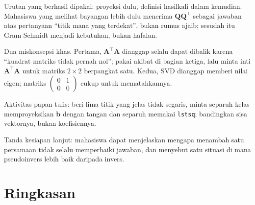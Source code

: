 \begin{untukdosen}
Urutan yang berhasil dipakai: proyeksi dulu, definisi hasilkali dalam kemudian.
Mahasiswa yang melihat bayangan lebih dulu menerima $\mathbf{Q}\mathbf{Q}^{\top}$ sebagai
jawaban atas pertanyaan ``titik mana yang terdekat'', bukan rumus ajaib; sesudah itu
Gram-Schmidt menjadi kebutuhan, bukan hafalan.

Dua miskonsepsi khas. Pertama, $\mathbf{A}^{\top}\mathbf{A}$ dianggap selalu dapat dibalik
karena ``kuadrat matriks tidak pernah nol''; pakai akibat di bagian ketiga, lalu minta
inti $\mathbf{A}^{\top}\mathbf{A}$ untuk matriks $2\times2$ berpangkat satu. Kedua, SVD
dianggap memberi nilai eigen; matriks $\begin{pmatrix}0&1\\0&0\end{pmatrix}$ cukup untuk
mematahkannya.

Aktivitas papan tulis: beri lima titik yang jelas tidak segaris, minta separuh kelas
memproyeksikan $\mathbf{b}$ dengan tangan dan separuh memakai \texttt{lstsq}; bandingkan
sisa vektornya, bukan koefisiennya.

Tanda kesiapan lanjut: mahasiswa dapat menjelaskan mengapa menambah satu persamaan tidak
selalu memperbaiki jawaban, dan menyebut satu situasi di mana pseudoinvers lebih baik
daripada invers.
\end{untukdosen}

\section{Ringkasan}

